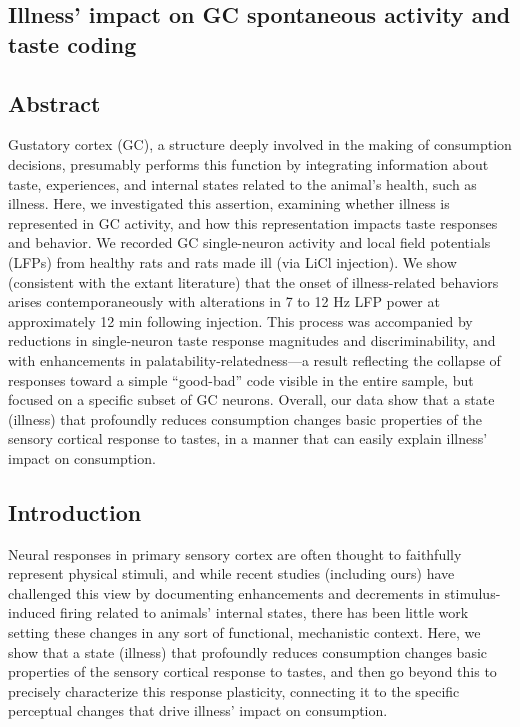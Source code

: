 \begin{refsection}

\chapter[Illness and taste processing]{Illness’ impact on GC spontaneous activity and taste coding}

\section{Abstract}
Gustatory cortex (GC), a structure deeply involved in the making of consumption decisions, presumably performs this function by integrating information about taste, experiences, and internal states related to the animal’s health, such as illness. Here, we investigated this assertion, examining whether illness is represented in GC activity, and how this representation impacts taste responses and behavior. We recorded GC single-neuron activity and local field potentials (LFPs) from healthy rats and rats made ill (via LiCl injection). We show (consistent with the extant literature) that the onset of illness-related behaviors arises contemporaneously with alterations in 7 to 12 Hz LFP power at approximately 12 min following injection. This process was accompanied by reductions in single-neuron taste response magnitudes and discriminability, and with enhancements in palatability-relatedness—a result reflecting the collapse of responses toward a simple “good-bad” code visible in the entire sample, but focused on a specific subset of GC neurons. Overall, our data show that a state (illness) that profoundly reduces consumption changes basic properties of the sensory cortical response to tastes, in a manner that can easily explain illness’ impact on consumption.

\section{Introduction}
Neural responses in primary sensory cortex are often thought to faithfully represent physical stimuli, and while recent studies (including ours) have challenged this view by documenting enhancements and decrements in stimulus-induced firing related to animals’ internal states, there has been little work setting these changes in any sort of functional, mechanistic context. Here, we show that a state (illness) that profoundly reduces consumption changes basic properties of the sensory cortical response to tastes, and then go beyond this to precisely characterize this response plasticity, connecting it to the specific perceptual changes that drive illness’ impact on consumption.


\end{refsection}
